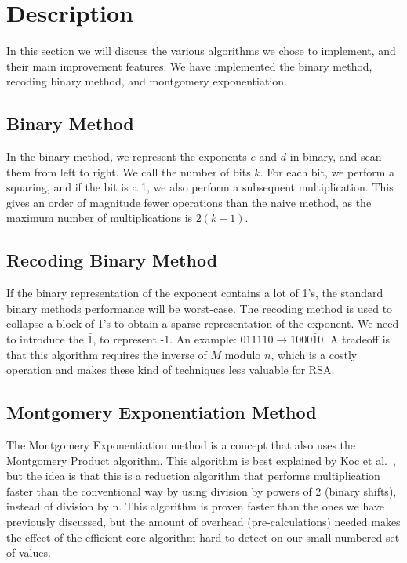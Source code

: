 \documentclass[twocolumn]{IEEEtran}
\begin{document}
\section{Description}
In this section we will discuss the various algorithms we chose to implement, and their main improvement features. We have implemented the binary method, recoding binary method, and montgomery exponentiation.

\subsection*{Binary Method}
In the binary method, we represent the exponents $e$ and $d$ in binary, and scan them from left to right. We call the number of bits $k$. For each bit, we perform a squaring, and if the bit is a 1, we also perform a subsequent multiplication. This gives an order of magnitude fewer operations than the naive method, as the maximum number of multiplications is $2(k-1)$.

\subsection*{Recoding Binary Method}
If the binary representation of the exponent contains a lot of 1’s, the standard binary methods performance will be worst-case. The recoding method is used to collapse a block of 1’s to obtain a sparse representation of the exponent. We need to introduce the $\bar{1}$, to represent -1. An example: $011110 \rightarrow 1000\bar{1}0$. A tradeoff is that this algorithm requires the inverse of $M$ modulo $n$, which is a costly operation and makes these kind of techniques less valuable for RSA.

\subsection*{Montgomery Exponentiation Method}
The Montgomery Exponentiation method is a concept that also uses the Montgomery Product algorithm. This algorithm is best explained by Koc et al.~\cite{koc}, but the idea is that this is a reduction algorithm that performs multiplication faster than the conventional way by using division by powers of 2 (binary shifts), instead of division by n. This algorithm is proven faster than the ones we have previously discussed, but the amount of overhead (pre-calculations) needed makes the effect of the efficient core algorithm hard to detect on our small-numbered set of values.
\end{document}
